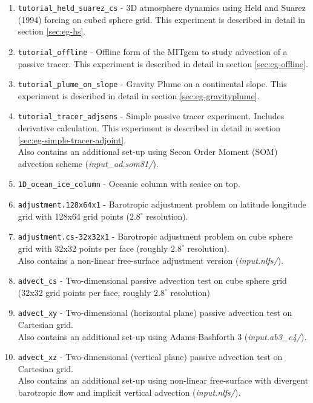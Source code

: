 \begin{enumerate}
\item \texttt{tutorial\_held\_suarez\_cs} - 3D atmosphere dynamics
  using Held and Suarez (1994) forcing on cubed sphere grid.  This
  experiment is described in detail in section \ref{sec:eg-hs}.

\item \texttt{tutorial\_offline} - Offline form of the MITgcm to study
  advection of a passive tracer.  This experiment is described in
  detail in section \ref{sec:eg-offline}.

\item \texttt{tutorial\_plume\_on\_slope} - Gravity Plume on a
  continental slope.  This experiment is described in detail in
  section \ref{sec:eg-gravityplume}.

\item \texttt{tutorial\_tracer\_adjsens} - Simple passive tracer
  experiment. Includes derivative calculation. This experiment is
  described in detail in section \ref{sec:eg-simple-tracer-adjoint}.\\
  Also contains an additional set-up using Secon Order Moment (SOM) advection
  scheme ({\it input\_ad.som81/}).

\item \texttt{1D\_ocean\_ice\_column} - Oceanic column with seaice on top.

\item \texttt{adjustment.128x64x1} - Barotropic adjustment problem on
  latitude longitude grid with 128x64 grid points ($2.8^\circ$ resolution).

\item \texttt{adjustment.cs-32x32x1} - Barotropic adjustment problem on
  cube sphere grid with 32x32 points per face (roughly $2.8^\circ$
  resolution).\\
  Also contains a non-linear free-surface adjustment version ({\it input.nlfs/}).

\item \texttt{advect\_cs} - Two-dimensional passive advection test on
  cube sphere grid (32x32 grid points per face, roughly $2.8^\circ$ resolution)

\item \texttt{advect\_xy} - Two-dimensional (horizontal plane) passive
  advection test on Cartesian grid.\\
  Also contains an additional set-up using Adams-Bashforth 3 ({\it input.ab3\_c4/}).

\item \texttt{advect\_xz} - Two-dimensional (vertical plane) passive
  advection test on Cartesian grid.\\
  Also contains an additional set-up using non-linear free-surface
   with divergent barotropic flow and implicit vertical advection ({\it input.nlfs/}).


\end{enumerate}
